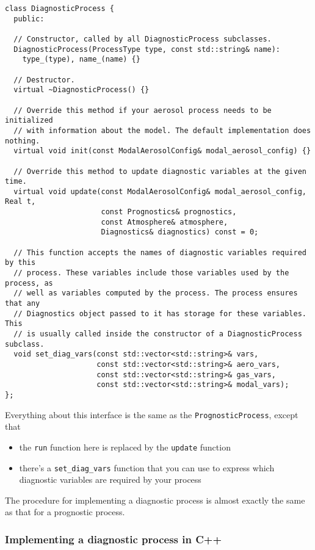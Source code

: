 \begin{lstlisting}
class DiagnosticProcess {
  public:

  // Constructor, called by all DiagnosticProcess subclasses.
  DiagnosticProcess(ProcessType type, const std::string& name):
    type_(type), name_(name) {}

  // Destructor.
  virtual ~DiagnosticProcess() {}

  // Override this method if your aerosol process needs to be initialized
  // with information about the model. The default implementation does nothing.
  virtual void init(const ModalAerosolConfig& modal_aerosol_config) {}

  // Override this method to update diagnostic variables at the given time.
  virtual void update(const ModalAerosolConfig& modal_aerosol_config, Real t,
                      const Prognostics& prognostics,
                      const Atmosphere& atmosphere,
                      Diagnostics& diagnostics) const = 0;

  // This function accepts the names of diagnostic variables required by this
  // process. These variables include those variables used by the process, as
  // well as variables computed by the process. The process ensures that any
  // Diagnostics object passed to it has storage for these variables. This
  // is usually called inside the constructor of a DiagnosticProcess subclass.
  void set_diag_vars(const std::vector<std::string>& vars,
                     const std::vector<std::string>& aero_vars,
                     const std::vector<std::string>& gas_vars,
                     const std::vector<std::string>& modal_vars);
};
\end{lstlisting}

Everything about this interface is the same as the \texttt{PrognosticProcess},
except that

\begin{itemize}
  \item the \texttt{run} function here is replaced by the \texttt{update} function
  \item there's a \texttt{set\_diag\_vars} function that you can use to express
        which diagnostic variables are required by your process
\end{itemize}

The procedure for implementing a diagnostic process is almost exactly
the same as that for a prognostic process.

\subsubsection{Implementing a diagnostic process in C++}

